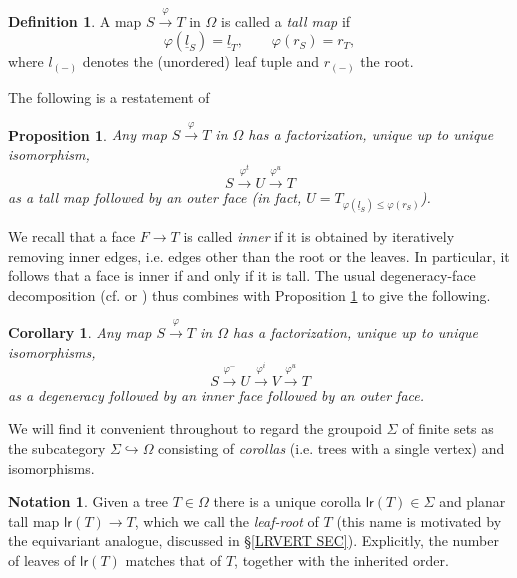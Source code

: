\documentclass[a4paper,10pt
,draft
]{article}%
\numberwithin{equation}{section}
\numberwithin{figure}{section}
\newtheorem{proposition}[equation]{Proposition}%
\newtheorem{corollary}[equation]{Corollary}%
\theoremstyle{definition} %
\newtheorem{definition}[equation]{Definition}%
\newtheorem{notation}[equation]{Notation}%
\newcommand{\1}{\ensuremath{\mathbbm 1}}%
\begin{document}
 
\begin{definition}
	A map $S \xrightarrow{\varphi} T$ in $\Omega$ is called a \textit{tall map} if 
	\[\varphi(\underline{l}_S) = \underline{l}_T, 
		\qquad
	\varphi(r_S)= r_T,\]
where $l_{(\minus)}$ denotes the (unordered) leaf tuple and $r_{(\minus)}$ the root.
\end{definition}


The following is a restatement of \cite[Cor. 5.24]{Pe17}

\begin{proposition}\label{TALLOUTERDEC PROP}
	Any map $S \xrightarrow{\varphi} T$ in $\Omega$ has a factorization, unique up to unique isomorphism,
	\[
		S \xrightarrow{\varphi^t} U \xrightarrow{\varphi^u} T
	\]
	as a tall map followed by an outer face (in fact, 
	$U= T_{\varphi(\underline{l}_S) \leq \varphi(r_S)}$).
\end{proposition}

We recall that a face $F \to T$ is called \textit{inner} if it is obtained by iteratively removing inner edges, i.e. edges other than the root or the leaves. In particular, it follows that a face is inner if and only if it is tall. 
The usual degeneracy-face decomposition
(cf. \cite[Lemma 3.1]{MW07} or \cite[Prop. 5.37]{Pe17})
thus combines with Proposition \ref{TALLOUTERDEC PROP} to give the following.


\begin{corollary}
	Any map $S \xrightarrow{\varphi} T$ in $\Omega$ has a factorization, unique up to unique isomorphisms,
\[
	S \xrightarrow{\varphi^-} U
	\xrightarrow{\varphi^i} V
	\xrightarrow{\varphi^u} T
\]
	as a degeneracy followed by an inner face followed by an outer face.
\end{corollary}
	


We will find it convenient  throughout to regard the 
groupoid $\Sigma$ of finite sets 
as the subcategory 
$\Sigma \hookrightarrow \Omega$
consisting of \textit{corollas}
(i.e. trees with a single vertex)
and isomorphisms.


\begin{notation}\label{UNIQCOR NOT}
	Given a tree $T \in \Omega$ there is a unique corolla $\mathsf{lr}(T) \in \Sigma$ and planar tall map 
	$\mathsf{lr}(T) \to T$, which we call the 
	\textit{leaf-root} of $T$ (this name is motivated by the equivariant analogue, discussed in \S \ref{LRVERT SEC}).
	Explicitly, the number of leaves of $\mathsf{lr}(T)$ matches that of $T$, together with the inherited order. 
\end{notation}
\end{document}
